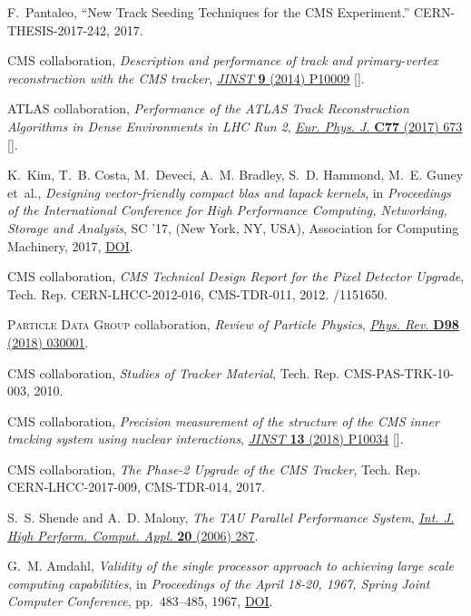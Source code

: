 \documentclass[a4paper,11pt]{article}
\begin{document}
\begin{thebibliography}{10}
F.~Pantaleo, ``{New Track Seeding Techniques for the CMS Experiment}.''
  CERN-THESIS-2017-242, 2017.

{\scshape CMS} collaboration, \emph{{Description and performance of track and
  primary-vertex reconstruction with the CMS tracker}},
  \href{https://doi.org/10.1088/1748-0221/9/10/P10009}{\emph{JINST} {\bfseries
  9} (2014) P10009} [\href{https://arxiv.org/abs/1405.6569}{{}}].

{\scshape ATLAS} collaboration, \emph{{Performance of the ATLAS Track
  Reconstruction Algorithms in Dense Environments in LHC Run 2}},
  \href{https://doi.org/10.1140/epjc/s10052-017-5225-7}{\emph{Eur. Phys. J.}
  {\bfseries C77} (2017) 673}
  [\href{https://arxiv.org/abs/1704.07983}{{}}].

K.~Kim, T.~B. Costa, M.~Deveci, A.~M. Bradley, S.~D. Hammond, M.~E. Guney
  et~al., \emph{Designing vector-friendly compact blas and lapack kernels},  in
  \emph{Proceedings of the International Conference for High Performance
  Computing, Networking, Storage and Analysis}, SC '17, (New York, NY, USA),
  Association for Computing Machinery, 2017,
  \href{https://doi.org/10.1145/3126908.3126941}{DOI}.

{\scshape CMS} collaboration, \emph{{CMS Technical Design Report for the Pixel
  Detector Upgrade}},  Tech. Rep. CERN-LHCC-2012-016, CMS-TDR-011, 2012.
/1151650.

{\scshape Particle Data Group} collaboration, \emph{{Review of Particle
  Physics}}, \href{https://doi.org/10.1103/PhysRevD.98.030001}{\emph{Phys.
  Rev.} {\bfseries D98} (2018) 030001}.

{\scshape CMS} collaboration, \emph{{Studies of Tracker Material}},  Tech. Rep.
  CMS-PAS-TRK-10-003, 2010.
  
{\scshape CMS} collaboration, \emph{{Precision measurement of the structure of
  the CMS inner tracking system using nuclear interactions}},
  \href{https://doi.org/10.1088/1748-0221/13/10/P10034}{\emph{JINST} {\bfseries
  13} (2018) P10034} [\href{https://arxiv.org/abs/1807.03289}{{}}].

{\scshape CMS} collaboration, \emph{{The Phase-2 Upgrade of the CMS Tracker}},
  Tech. Rep. CERN-LHCC-2017-009, CMS-TDR-014, 2017.

S.~S. Shende and A.~D. Malony, \emph{The {TAU} {P}arallel {P}erformance
  {S}ystem}, \href{https://doi.org/10.1177/1094342006064482}{\emph{Int. J. High
  Perform. Comput. Appl.} {\bfseries 20} (2006) 287}.

G.~M. Amdahl, \emph{Validity of the single processor approach to achieving
  large scale computing capabilities},  in \emph{Proceedings of the April
  18-20, 1967, Spring Joint Computer Conference}, pp.~483--485, 1967,
  \href{https://doi.org/10.1145/1465482.1465560}{DOI}.
  
  \end{thebibliography}\endgroup
\end{document}

